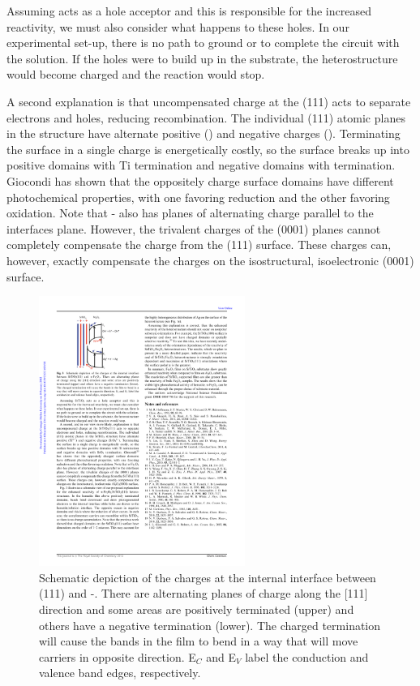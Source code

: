 Assuming  acts as a hole acceptor and this is responsible for the increased
reactivity, we must also consider what happens to these holes.  In our experimental
set-up, there is no path to ground or to complete the circuit with the solution.  If the
holes were to build up in the substrate, the heterostructure would become charged and the
reaction would stop.

A second explanation is that uncompensated charge at the (111) acts to separate
electrons and holes, reducing recombination.  The individual (111) atomic planes in the
 structure have alternate positive () and negative charges
().  Terminating the surface in a single charge is energetically costly, so
the surface breaks up into positive domains with Ti termination and negative domains with
 termination.  Giocondi\cite{Giocondi:2003wc} has shown that the oppositely
charge surface domains have different photochemical properties, with one favoring
reduction and the other favoring oxidation.  Note that \textalpha- also has
planes of alternating charge parallel to the interfaces plane.  However, the trivalent
charges of the (0001) planes cannot completely compensate the charge from the
(111) surface.  These charges can, however, exactly compensate the charges on
the isostructural, isoelectronic (0001) surface.
\begin{figure}
\begin{center}
\includegraphics[width=0.6\textwidth]{polarterms.pdf}
\caption[Charges at internal interface between  and ]{%
		Schematic depiction of the charges at the internal interface 
		between (111) and \textalpha-. There are 
		alternating planes of charge along the [111] direction and some 
		areas are positively terminated (upper) and others have a negative 
		termination (lower). The charged termination will cause the bands 
		in the film to bend in a way that will move carriers in opposite 
		direction. E$_C$ and E$_V$ label the conduction and valence band 
		edges, respectively.}
\label{fig:polarterms}
\end{center}
\end{figure}
